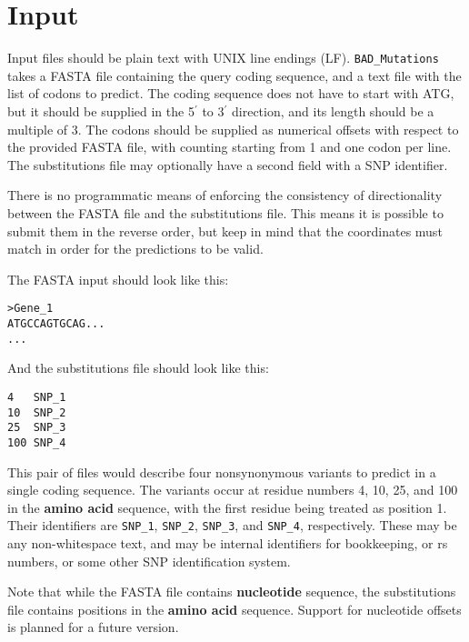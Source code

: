 \documentclass[12pt]{article}
\newcommand{\BM}{\texttt{BAD\_Mutations} }
\begin{document}
\section*{Input}
\par Input files should be plain text with UNIX line endings (LF). \BM takes a
FASTA file containing the query coding sequence, and a text file with the list
of codons to predict. The coding sequence does not have to start with ATG, but
it should be supplied in the 5$^{\prime}$ to 3$^{\prime}$ direction, and its
length should be a multiple of 3. The codons should be supplied as numerical
offsets with respect to the provided FASTA file, with counting starting from 1
and one codon per line. The substitutions file may optionally have a second
field with a SNP identifier.

\par There is no programmatic means of enforcing the consistency of
directionality between the FASTA file and the substitutions file. This means it
is possible to submit them in the reverse order, but keep in mind that the
coordinates must match in order for the predictions to be valid.

\par The FASTA input should look like this:
\begin{Verbatim}[frame=single, fontsize=\small, rulecolor=\color{gray}]
>Gene_1
ATGCCAGTGCAG...
...
\end{Verbatim}
And the substitutions file should look like this:
\begin{Verbatim}[frame=single, fontsize=\small, rulecolor=\color{gray}]
4   SNP_1
10  SNP_2
25  SNP_3
100 SNP_4
\end{Verbatim}

\par This pair of files would describe four nonsynonymous variants to predict
in a single coding sequence. The variants occur at residue numbers 4, 10, 25,
and 100 in the \textbf{amino acid} sequence, with the first residue being
treated as position 1. Their identifiers are \texttt{SNP\_1}, \texttt{SNP\_2},
\texttt{SNP\_3}, and \texttt{SNP\_4}, respectively. These may be any
non-whitespace text, and may be internal identifiers for bookkeeping, or
rs numbers, or some other SNP identification system.

\par Note that while the FASTA file contains \textbf{nucleotide} sequence, the
substitutions file contains positions in the \textbf{amino acid} sequence.
Support for nucleotide offsets is planned for a future version.
\end{document}
